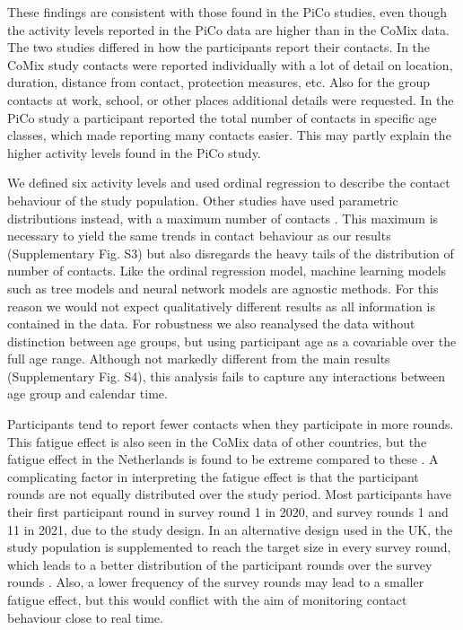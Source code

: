 \documentclass[fleqn,10pt]{wlscirep}
\begin{document}
These findings are consistent with those found in the PiCo studies, even though the activity levels reported in the PiCo data are higher than in the CoMix data. The two studies differed in how the participants report their contacts. In the CoMix study contacts were reported individually with a lot of detail on location, duration, distance from contact, protection measures, etc. Also for the group contacts at work, school, or other places additional details were requested. In the PiCo study a participant reported the total number of contacts in specific age classes, which made reporting many contacts easier. This may partly explain the higher activity levels found in the PiCo study.

We defined six activity levels and used ordinal regression to describe the contact behaviour of the study population. Other studies have used parametric distributions instead, with a maximum number of contacts \cite{Gimma_2022}. This maximum is necessary to yield the same trends in contact behaviour as our results (Supplementary Fig. S3) but also disregards the heavy tails of the distribution of number of contacts. Like the ordinal regression model, machine learning models such as tree models and neural network models \cite{Hastie_2009} are agnostic methods. For this reason we would not expect qualitatively different results as all information is contained in the data. For robustness we also reanalysed the data without distinction between age groups, but using participant age as a covariable over the full age range. Although not markedly different from the main results  (Supplementary Fig. S4), this analysis fails to capture any interactions between age group and calendar time.

Participants tend to report fewer contacts when they participate in more rounds. This fatigue effect is also seen in the CoMix data of other countries, but the fatigue effect in the Netherlands is found to be extreme compared to these \cite{Wong_2022b}. A complicating factor in interpreting the fatigue effect is that the participant rounds are not equally distributed over the study period. Most participants have their first participant round in survey round 1 in 2020, and survey rounds 1 and 11 in 2021, due to the study design. In an alternative design used in the UK, the study population is supplemented to reach the target size in every survey round, which leads to a better distribution of the participant rounds over the survey rounds \cite{Gimma_2022}. Also, a lower frequency of the survey rounds may lead to a smaller fatigue effect, but this would conflict with the aim of monitoring contact behaviour close to real time.
\end{document}
